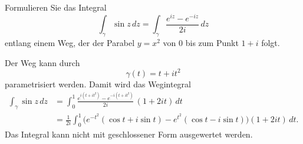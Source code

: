 Formulieren Sie das Integral
\[
\int_\gamma \sin z \,dz
=
\int_\gamma \frac{e^{iz}-e^{-iz}}{2i} \,dz
\]
entlang einem Weg, der der Parabel $y=x^2$ von $0$ bis zum Punkt $1+i$
folgt.

\begin{loesung}
Der Weg kann durch
\[
\gamma(t)
=
t + it^2
\]
parametrisiert werden.
Damit wird das Wegintegral
\begin{align*}
\int_\gamma \sin z\,dz
&=
\int_0^1 \frac{e^{i(t+it^2)}-e^{-i(t+it^2)}}{2i}\,(1+2it)\,dt
\\
&=
\frac{1}{2i}
\int_0^1 
\bigl(
e^{-t^2}(\cos t+i\sin t) - e^{t^2}(\cos t-i\sin t)
\bigr)
(1+2it)
\,dt.
\end{align*}
Das Integral kann nicht mit geschlossener Form ausgewertet werden.
\end{loesung}

